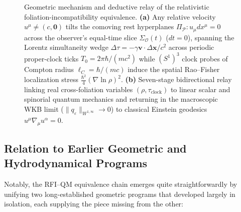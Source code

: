 \documentclass[11pt, a4paper]{article}
\theoremstyle{definition}
\begin{document}
\begin{figure}[htbp]
{%
}
\caption{Geometric mechanism and deductive relay of the relativistic foliation-incompatibility equivalence. \textbf{(a)} Any relative velocity $u^\mu \neq (c,\mathbf{0})$ tilts the comoving rest hyperplanes $\Pi_{\mathcal{P}}: u_\mu dx^\mu = 0$ across the observer's equal-time slice $\Sigma_{\mathcal{O}}(t)$ ($dt=0$), spanning the Lorentz simultaneity wedge $\Delta\tau = -\gamma\mathbf{v}\cdot\Delta\mathbf{x}/c^2$ across periodic proper-clock ticks $T_0 = 2\pi\hbar/(mc^2)$ while $(S^1)^3$ clock probes of Compton radius $\ell_C = \hbar/(mc)$ induce the spatial Rao--Fisher localization stress $\frac{\hbar^2}{4}(\nabla\ln\rho)^2$. \textbf{(b)} Seven-stage bidirectional relay linking real cross-foliation variables $(\rho, \tau_{\text{clock}})$ to linear scalar and spinorial quantum mechanics and returning in the macroscopic WKB limit ($\|q_\varepsilon\|_{W^{1,\infty}} \to 0$) to classical Einstein geodesics $u^\mu\nabla_\mu u^\alpha = 0$.}
\label{fig:foliation_bridge_schematic}
\end{figure}

\subsection{Relation to Earlier Geometric and Hydrodynamical Programs}
\label{sec:historical_synthesis}

Notably, the RFI--QM equivalence chain emerges quite straightforwardly by unifying two long-established geometric programs that developed largely in isolation, each supplying the piece missing from the other:
\end{document}
